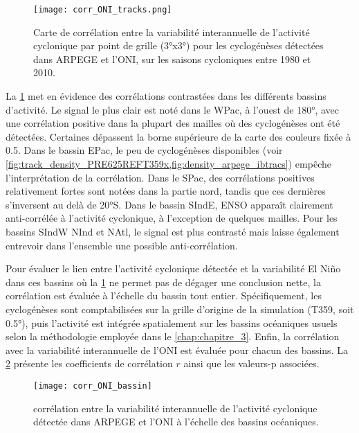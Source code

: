 \documentclass[../main.tex]{subfiles}
\begin{document}
\begin{figure}[tpb]
    \centering
    \texttt{[image: corr\_ONI\_tracks.png]}
    \caption{Carte de corrélation entre la variabilité interannuelle de l'activité cyclonique par point de grille (\ang{3}x\ang{3}) pour les cyclogénèses
    détectées dans ARPEGE et l'ONI, sur les saisons cycloniques entre \num{1980} et \num{2010}.}
    \label{fig:corr_ONI_pt}
\end{figure}

La \cref{fig:corr_ONI_pt} met en évidence des corrélations contrastées dans les différents bassins d'activité. Le signal le plus clair est noté dans le WPac, à
l'ouest de \ang{180}, avec une corrélation positive dans la plupart des mailles où des cyclogénèses ont été détectées. Certaines dépassent la borne supérieure
de la carte des couleurs fixée à \num{0.5}. Dans le bassin EPac, le peu de cyclogénèses disponibles (voir
\cref{fig:track_density_PRE625REFT359x,fig:density_arpege_ibtracs}) empêche l'interprétation de la corrélation. Dans le SPac, des corrélations positives
relativement fortes sont notées dans la partie nord, tandis que ces dernières s'inversent au delà de \ang{20}S. Dans le bassin SIndE, ENSO apparaît clairement
anti-corrélée à l'activité cyclonique, à l'exception de quelques mailles. Pour les bassins SIndW NInd et NAtl, le signal est plus contrasté mais laisse également
entrevoir dans l'ensemble une possible anti-corrélation.

Pour évaluer le lien entre l'activité cyclonique détectée et la variabilité El Niño dans ces bassins où la \cref{fig:corr_ONI_pt} ne permet pas de dégager une
conclusion nette, la corrélation est évaluée à l'échelle du bassin tout entier. Spécifiquement, les cyclogénèses sont comptabilisées sur la grille d'origine de
la simulation (T359, soit \ang{0.5}), puis l'activité est intégrée spatialement sur les bassins océaniques usuels selon la méthodologie employée dans le
\cref{chap:chapitre_3}. Enfin, la corrélation avec la variabilité interannuelle de l'ONI est évaluée pour chacun des bassins. La
\cref{fig:corr_ONI_bassin} présente les coefficients de corrélation $r$ ainsi que les valeurs-p associées.

\begin{figure}[tpb]
    \centering
    \texttt{[image: corr\_ONI\_bassin]}
    \caption{corrélation entre la variabilité interannuelle de l'activité cyclonique détectée dans ARPEGE et l'ONI à l'échelle des bassins océaniques.}
    \label{fig:corr_ONI_bassin}
\end{figure}
\end{document}
